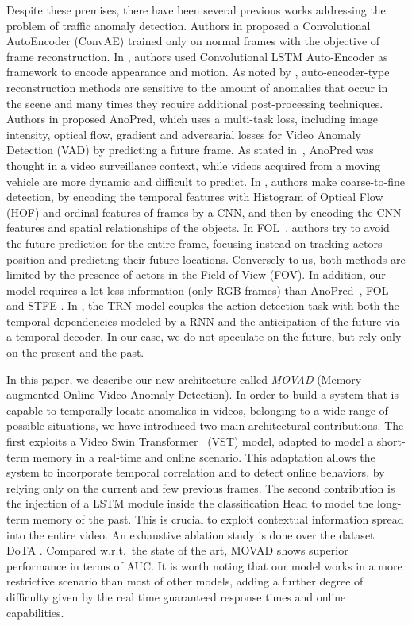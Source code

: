 Despite these premises, there have been several previous works addressing the problem of traffic anomaly detection.
Authors in \cite{hasan2016learning} proposed a Convolutional AutoEncoder (ConvAE) trained only on normal frames with the objective of frame reconstruction.
In \cite{luo2017remembering, wang2018abnormal}, authors used Convolutional LSTM Auto-Encoder as framework to encode appearance and motion.
As noted by \cite{ramachandra2020survey}, auto-encoder-type reconstruction methods are sensitive to the amount of anomalies that occur in the scene and many times they require additional post-processing techniques.
Authors in \cite{liu2018future} proposed AnoPred, which uses a multi-task loss, including image intensity, optical flow, gradient and adversarial losses for Video Anomaly Detection (VAD) by predicting a future frame.
As stated in~\cite{9712446}, AnoPred was thought in a video surveillance context, while videos acquired from a moving vehicle are more dynamic and difficult to predict.
In \cite{zhou_spatio-temporal_2022}, authors make coarse-to-fine detection, by encoding the temporal features with Histogram of Optical Flow (HOF) \cite{wang2013action} and ordinal features of frames by a CNN, and then by encoding the CNN features and spatial relationships of the objects.
In FOL~\cite{9712446}, authors try to avoid the future prediction for the entire frame, focusing instead on tracking actors position and predicting their future locations.
Conversely to us, both methods are limited by the presence of actors in the Field of View (FOV).
In addition, our model requires a lot less information (only RGB frames) than AnoPred~\cite{liu2018future}, FOL \cite{9712446} and STFE \cite{zhou_spatio-temporal_2022}.
In \cite{xu2019temporal}, the TRN model couples the action detection task with both the temporal dependencies modeled by a RNN and the anticipation of the future via a temporal decoder.
In our case, we do not speculate on the future, but rely only on the present and the past.

In this paper, we describe our new architecture called \emph{MOVAD} (Memory-augmented Online Video Anomaly Detection).
In order to build a system that is capable to temporally locate anomalies in videos, belonging to a wide range of possible situations, we have introduced two main architectural contributions.
The first exploits a Video Swin Transformer~\cite{liu_video_2022} (VST) model, adapted to model a short-term memory in a real-time and online scenario.
This adaptation allows the system to incorporate temporal correlation and to detect online behaviors, by relying only on the current and few previous frames.
The second contribution is the injection of a LSTM module inside the classification Head to model the long-term memory of the past.
This is crucial to exploit contextual information spread into the entire video.
An exhaustive ablation study is done over the dataset DoTA \cite{9712446}.
Compared w.r.t.~the state of the art, MOVAD shows superior performance in terms of AUC.
It is worth noting that our model works in a more restrictive scenario than most of other models, adding a further degree of difficulty given by the real time guaranteed response times and online capabilities.